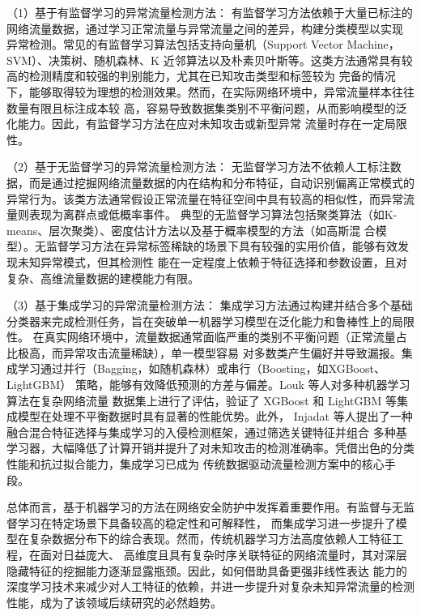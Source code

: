 （1）基于有监督学习的异常流量检测方法：
有监督学习方法依赖于大量已标注的网络流量数据，通过学习正常流量与异常流量之间的差异，构建分类模型以实现
异常检测\cite{megantara2021hybrid}。常见的有监督学习算法包括支持向量机（Support Vector Machine，SVM）、决策树、随机森林、K
近邻算法以及朴素贝叶斯等。这类方法通常具有较高的检测精度和较强的判别能力，尤其在已知攻击类型和标签较为
完备的情况下，能够取得较为理想的检测效果。然而，在实际网络环境中，异常流量样本往往数量有限且标注成本较
高，容易导致数据集类别不平衡问题，从而影响模型的泛化能力。因此，有监督学习方法在应对未知攻击或新型异常
流量时存在一定局限性。

（2）基于无监督学习的异常流量检测方法：
无监督学习方法不依赖人工标注数据，而是通过挖掘网络流量数据的内在结构和分布特征，自动识别偏离正常模式的
异常行为\cite{alam2025unsupervised}。该类方法通常假设正常流量在特征空间中具有较高的相似性，而异常流量则表现为离群点或低概率事件。
典型的无监督学习算法包括聚类算法（如K-means、层次聚类）、密度估计方法以及基于概率模型的方法（如高斯混
合模型）。无监督学习方法在异常标签稀缺的场景下具有较强的实用价值，能够有效发现未知异常模式，但其检测性
能在一定程度上依赖于特征选择和参数设置，且对复杂、高维流量数据的建模能力有限。

（3）基于集成学习的异常流量检测方法：
集成学习方法通过构建并结合多个基础分类器来完成检测任务，旨在突破单一机器学习模型在泛化能力和鲁棒性上的局限性。
在真实网络环境中，流量数据通常面临严重的类别不平衡问题（正常流量占比极高，而异常攻击流量稀缺），单一模型容易
对多数类产生偏好并导致漏报。集成学习通过并行（Bagging，如随机森林）或串行（Boosting，如XGBoost、LightGBM）
策略，能够有效降低预测的方差与偏差。Louk 等人\cite{louk2022revisiting}对多种机器学习算法在复杂网络流量
数据集上进行了评估，验证了 XGBoost 和 LightGBM 等集成模型在处理不平衡数据时具有显著的性能优势。此外，
Injadat 等人\cite{injadat2021machine}提出了一种融合混合特征选择与集成学习的入侵检测框架，通过筛选关键特征并组合
多种基学习器，大幅降低了计算开销并提升了对未知攻击的检测准确率。凭借出色的分类性能和抗过拟合能力，集成学习已成为
传统数据驱动流量检测方案中的核心手段。

总体而言，基于机器学习的方法在网络安全防护中发挥着重要作用。有监督与无监督学习在特定场景下具备较高的稳定性和可解释性，
而集成学习进一步提升了模型在复杂数据分布下的综合表现。然而，传统机器学习方法高度依赖人工特征工程，在面对日益庞大、
高维度且具有复杂时序关联特征的网络流量时，其对深层隐藏特征的挖掘能力逐渐显露瓶颈。因此，如何借助具备更强非线性表达
能力的深度学习技术来减少对人工特征的依赖，并进一步提升对复杂未知异常流量的检测性能，成为了该领域后续研究的必然趋势。

